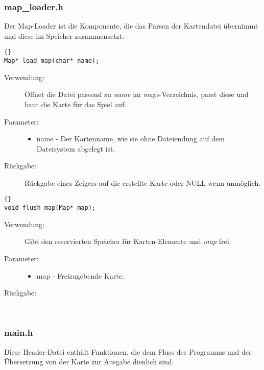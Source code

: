 \documentclass[11pt,a4paper,notitlepage]{report}
\begin{document}
	
	\newpage
	\subsubsection*{map\_loader.h}
	Der Map-Loader ist die Komponente, die das Parsen der Kartendatei übernimmt und diese im Speicher zusammensetzt.
	
		\begin{lstlisting}[caption=load\_map]{}
Map* load_map(char* name);
		\end{lstlisting}
		
	\begin{description}
		\item[Verwendung:] Öffnet die Datei passend zu \textit{name} im \textit{maps}-Verzeichnis, parst diese und baut die Karte für das Spiel auf.
		\item[Parameter:] \hfill
		\begin{itemize}
			\item name - Der Kartenname, wie sie ohne Dateiendung auf dem Dateisystem abgelegt ist.
		\end{itemize}
		\item[Rückgabe:] Rückgabe eines Zeigers auf die erstellte Karte oder NULL wenn unmöglich.
	\end{description}
	
		\begin{lstlisting}[caption=flush\_map]{}
void flush_map(Map* map);
		\end{lstlisting}
		
	\begin{description}
		\item[Verwendung:] Gibt den reservierten Speicher für Karten-Elemente und \textit{map} frei.
		\item[Parameter:] \hfill
		\begin{itemize}
			\item map - Freizugebende Karte.
		\end{itemize}
		\item[Rückgabe:] -
	\end{description}
	
	\newpage
	\subsubsection*{main.h}
	Diese Header-Datei enthält Funktionen, die dem Fluss des Programms und der Übersetzung von der Karte zur Ausgabe dienlich sind.
	
\end{document}
